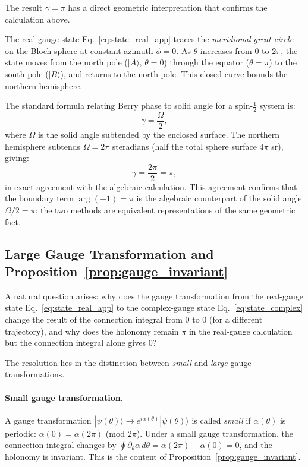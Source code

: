 \documentclass[%
 reprint,
 amsmath,amssymb,
 aps,
 prb,
]{revtex4-2}
\numberwithin{equation}{section}
\theoremstyle{definition}
\theoremstyle{remark}
\begin{document}
The result $\gamma = \pi$ has a direct geometric interpretation that confirms the calculation above.

The real-gauge state Eq.~\eqref{eq:state_real_app} traces the \emph{meridional great circle} on the Bloch sphere at constant azimuth $\phi = 0$.  As $\theta$ increases from $0$ to $2\pi$, the state moves from the north pole ($|A\rangle$, $\theta = 0$) through the equator ($\theta = \pi$) to the south pole ($|B\rangle$), and returns to the north pole. This closed curve bounds the northern hemisphere.

The standard formula relating Berry phase to solid angle for a spin-$\tfrac{1}{2}$ system is:
\begin{equation}
\gamma = \frac{\Omega}{2},
\label{eq:solid_angle_formula}
\end{equation}
where $\Omega$ is the solid angle subtended by the enclosed surface. The northern hemisphere subtends $\Omega = 2\pi$ steradians (half the total sphere surface $4\pi$ sr), giving:
\begin{equation}
\gamma = \frac{2\pi}{2} = \pi,
\label{eq:solid_angle_result}
\end{equation}
in exact agreement with the algebraic calculation. This agreement confirms that the boundary term $\arg(-1) = \pi$ is the algebraic counterpart of the solid angle $\Omega/2 = \pi$: the two methods are equivalent representations of the same geometric fact.

\subsection{Large Gauge Transformation and Proposition~\ref{prop:gauge_invariant}}

A natural question arises: why does the gauge transformation from the real-gauge state Eq.~\eqref{eq:state_real_app} to the complex-gauge state Eq.~\eqref{eq:state_complex} change the result of the connection integral from $0$ to $0$ (for a different trajectory), and why does the holonomy remain $\pi$ in the real-gauge calculation but the connection integral alone gives $0$?

The resolution lies in the distinction between \emph{small} and \emph{large} gauge transformations.

\paragraph{Small gauge transformation.}
A gauge transformation $|\psi(\theta)\rangle \to e^{i\alpha(\theta)}|\psi(\theta)\rangle$ is called \emph{small} if $\alpha(\theta)$ is periodic: $\alpha(0) = \alpha(2\pi)$ (mod $2\pi$). Under a small gauge transformation, the connection integral changes by $\oint \partial_\theta\alpha\,d\theta = \alpha(2\pi) - \alpha(0) = 0$, and the holonomy is invariant. This is the content of Proposition~\ref{prop:gauge_invariant}.
\end{document}
